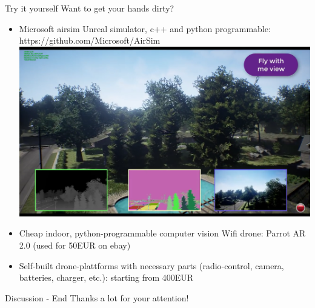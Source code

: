 \documentclass[aspectratio=169]{beamer}
\begin{document}
\begin{frame}{Try it yourself}
	Want to get your hands dirty?
	\begin{itemize}
		\item Microsoft airsim Unreal simulator, c++ and python programmable: https://github.com/Microsoft/AirSim\\
		\centering
            \href{run:./videos/AirSimDemo.mp4?autostart}
            {\includegraphics[width=.45\linewidth]{images/AirSimDemo.png}}	
		\item Cheap indoor, python-programmable computer vision Wifi drone: Parrot AR 2.0 (used for 50EUR on ebay)
		\item Self-built drone-plattforms with necessary parts (radio-control, camera, batteries, charger, etc.): starting from 400EUR
	\end{itemize}
\end{frame}

\begin{frame}{Discussion - End}
	\center
	\huge{Thanks a lot for your attention!}
\end{frame}
\end{document}
